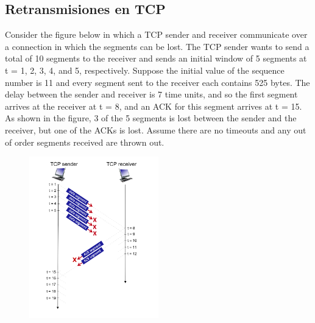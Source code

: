 \subsection*{Retransmisiones en TCP}
\noindent Consider the figure below in which a TCP sender and receiver communicate over a connection in which the segments can be lost. The TCP sender wants to send
a total of 10 segments to the receiver and sends an initial window of 5 segments at t = 1, 2, 3, 4, and 5, respectively. Suppose the initial value of the sequence number
is 11 and every segment sent to the receiver each contains 525 bytes. The delay between the sender and receiver is 7 time units, and so the first segment arrives at the
receiver at t = 8, and an ACK for this segment arrives at t = 15. As shown in the figure, 3 of the 5 segments is lost between the sender and the receiver, but one of the
ACKs is lost. Assume there are no timeouts and any out of order segments received are thrown out.
\begin{figure}
    \centering
    \includegraphics[width=0.5\textwidth]{img/retransmision.png}
\end{figure}
